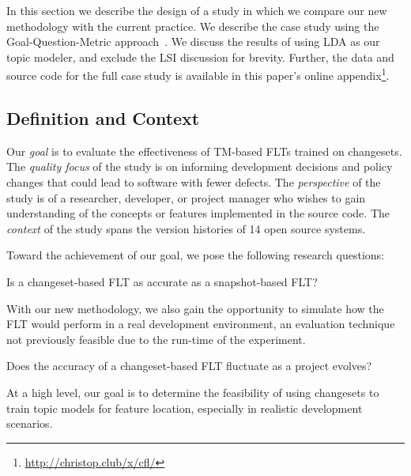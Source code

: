 
In this section we describe the design of a study in which we compare our new
methodology with the current practice. We describe the case study using the
Goal-Question-Metric approach~\cite{Basili-etal:94}.  We discuss the results of
using LDA as our topic modeler, and exclude the LSI discussion for brevity.
Further, the data and source code for the full case study is available in this
paper's online appendix\footnote{\url{http://christop.club/x/cfl/}}.

\subsection{Definition and Context}

Our \textit{goal} is to evaluate the effectiveness of TM-based FLTs trained
on changesets.  The \textit{quality focus} of the study is on informing
development decisions and policy changes that could lead to software with fewer
defects.  The \textit{perspective} of the study is of a researcher, developer,
or project manager who wishes to gain understanding of the concepts or features
implemented in the source code.  The \textit{context} of the study spans the
version histories of 14 open source systems.

Toward the achievement of our goal, we pose the following research questions:
\begin{description}[font=\itshape\mdseries,leftmargin=10mm,style=sameline]
    \item[RQ1] Is a changeset-based FLT as accurate as a snapshot-based FLT?
\end{description}

With our new methodology, we also gain the opportunity to simulate how the FLT
would perform in a real development environment, an evaluation technique
not previously feasible due to the run-time of the experiment.

\begin{description}[font=\itshape\mdseries,leftmargin=10mm,style=sameline]
    \item[RQ2] Does the accuracy of a changeset-based FLT fluctuate as a project evolves?
\end{description}

At a high level, our goal is to determine the feasibility of using changesets
to train topic models for feature location, especially in realistic development scenarios.

